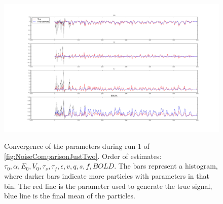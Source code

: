\begin{figure}[H]
\subfigure
{\label{fig:ConvergenceRuns1c} \includegraphics[clip=true,trim=6cm 2cm 6cm 3cm, width=\textwidth]{images/highnoise_run5_3}}
\caption[Convergence of the parameters during run 1 of \autoref{fig:NoiseComparisonJustTwo}]
{Convergence of the parameters during run 1 of \autoref{fig:NoiseComparisonJustTwo}.
Order of estimates: $\tau_0, \alpha, E_0, V_0, \tau_s, \tau_f, \epsilon, v,
q, s, f, BOLD$.  The bars represent
a histogram, where darker bars indicate more particles with parameters in that bin. The red 
line is the parameter used to generate the true signal, blue line is the final mean of the
particles.}
\label{fig:ConvergenceRuns1}
\end{figure}

